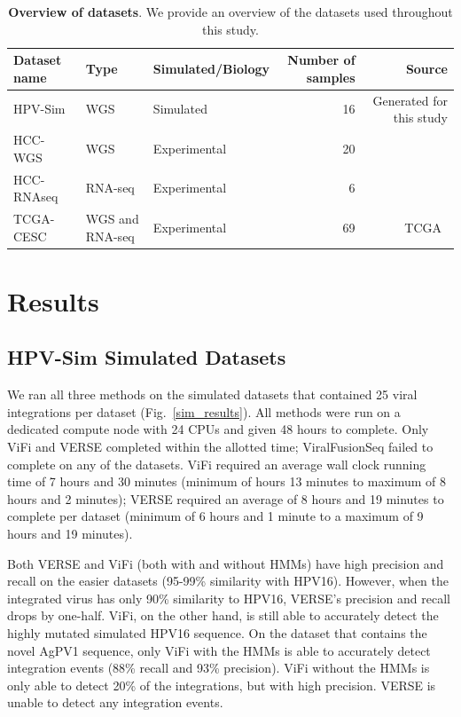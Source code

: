 \documentclass{bioinfo}
\begin{document}
\begin{table}[htb]
\centering
\caption{\textbf{Overview of datasets}.  We provide an overview of the datasets used throughout this study.  }
\label{table:data}
\begin{tabular}{|l|l|l|r|r|}
\hline
Dataset name & Type & Simulated/Biology & Number of samples & Source \\ \hline
HPV-Sim & WGS &Simulated& 16 & Generated for this study \\ \hline
HCC-WGS & WGS & Experimental&20 & ~\cite{Sung2012} \\ \hline
HCC-RNAseq & RNA-seq & Experimental&6 & ~\cite{Lau2014} \\ \hline
TCGA-CESC & WGS and RNA-seq &Experimental& 69 & TCGA~\cite{TODO} \\ \hline 
\end{tabular}
\end{table}
\section{Results}

\subsection{HPV-Sim Simulated Datasets}
We ran all three methods on the simulated datasets that contained 25 viral integrations per dataset (Fig.~\ref{sim_results}).  All methods were run on a dedicated compute node with 24 CPUs and given 48 hours to complete.  Only ViFi and VERSE completed within the allotted time; ViralFusionSeq failed to complete on any of the datasets.  ViFi required an average wall clock running time of 7 hours and 30 minutes (minimum of hours 13 minutes to maximum of 8 hours and 2 minutes); VERSE required an average of 8 hours and 19 minutes to complete per dataset (minimum of 6 hours and 1 minute to a maximum of 9 hours and 19 minutes).  

Both VERSE and ViFi (both with and without HMMs) have high precision and recall on the easier datasets (95-99\% similarity with HPV16).  However, when the integrated virus has only 90\% similarity to HPV16, VERSE's precision and recall drops by one-half.  ViFi, on the other hand, is still able to accurately detect the highly mutated simulated HPV16 sequence.  On the dataset that contains the novel AgPV1 sequence, only ViFi with the HMMs is able to accurately detect integration events (88\% recall and 93\% precision).  ViFi without the HMMs is only able to detect 20\% of the integrations, but with high precision.  VERSE is unable to detect any integration events.  
\end{document}
